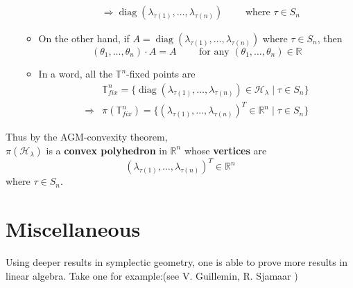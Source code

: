 \documentclass[11pt]{amsart}
\numberwithin{equation}{section}
\theoremstyle{plain}
\theoremstyle{plain}
\numberwithin{equation}{section}
\theoremstyle{remark}
\DeclareMathOperator{\diag}{diag}
\begin{document}
\begin{itemize}
\begin{itemize}
\begin{equation*}
\begin{aligned}
			&\Rightarrow \diag(\lambda_{\tau(1)},\ldots,\lambda_{\tau(n)})  \qquad\text{ where } \tau \in S_n
		\end{aligned}
		\end{equation*}
		\item On the other hand, if $A=\diag (\lambda_{\tau(1)},\ldots,\lambda_{\tau(n)})$ where $\tau \in S_n$, then
		$$(\theta_1,\ldots, \theta_n)\cdot A=A \qquad\text{ for any } (\theta_1,\ldots, \theta_n) \in \mathbb{R}$$
		\item In a word, all the $\mathbb{T}^n$-fixed points are
		\begin{equation*}
		\begin{aligned}
		&\mathbb{T}^n_{fix}=\{\diag(\lambda_{\tau(1)},\ldots,\lambda_{\tau(n)}) \in \mathcal{H}_\lambda \mid \tau \in S_n\}\\
		\Rightarrow& \pi(\mathbb{T}^n_{fix})=\{(\lambda_{\tau(1)},\ldots,\lambda_{\tau(n)})^T \in \mathbb{R}^n \mid \tau \in S_n\}
		\end{aligned}
		\end{equation*}
	\end{itemize}
\end{itemize}

Thus by the AGM-convexity theorem,\\
$\pi (\mathcal{H}_\lambda)$ is a \textbf{convex polyhedron} in $\mathbb{R}^n$ whose \textbf{vertices} are
$$(\lambda_{\tau(1)},\ldots,\lambda_{\tau(n)})^T \in \mathbb{R}^n$$
where $\tau \in S_n$.


\section{Miscellaneous} 
Using deeper results in symplectic geometry, one is able to prove more results in linear algebra. Take one for example:(see V. Guillemin, R. Sjamaar \cite{VR})
\end{document}
